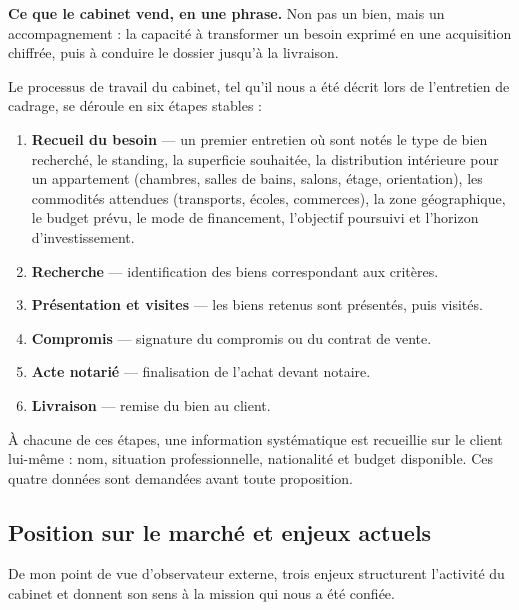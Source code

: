 \documentclass[12pt,a4paper]{article}
\begin{document}
\begin{encadre}
	\textbf{\color{eccblue}Ce que le cabinet vend, en une phrase.} Non pas un bien,
	mais un accompagnement : la capacité à transformer un besoin exprimé en une
	acquisition chiffrée, puis à conduire le dossier jusqu'à la livraison.
\end{encadre}

Le processus de travail du cabinet, tel qu'il nous a été décrit lors de
l'entretien de cadrage, se déroule en six étapes stables :

\begin{enumerate}
	\item \textbf{Recueil du besoin} --- un premier entretien où sont notés le
	type de bien recherché, le standing, la superficie souhaitée, la
	distribution intérieure pour un appartement (chambres, salles de bains,
	salons, étage, orientation), les commodités attendues (transports, écoles,
	commerces), la zone géographique, le budget prévu, le mode de financement,
	l'objectif poursuivi et l'horizon d'investissement.
	\item \textbf{Recherche} --- identification des biens correspondant aux critères.
	\item \textbf{Présentation et visites} --- les biens retenus sont présentés,
	puis visités.
	\item \textbf{Compromis} --- signature du compromis ou du contrat de vente.
	\item \textbf{Acte notarié} --- finalisation de l'achat devant notaire.
	\item \textbf{Livraison} --- remise du bien au client.
\end{enumerate}

À chacune de ces étapes, une information systématique est recueillie sur le
client lui-même : nom, situation professionnelle, nationalité et budget
disponible. Ces quatre données sont demandées avant toute proposition.

\subsection{Position sur le marché et enjeux actuels}


De mon point de vue d'observateur externe, trois enjeux structurent l'activité du
cabinet et donnent son sens à la mission qui nous a été confiée.
\end{document}
